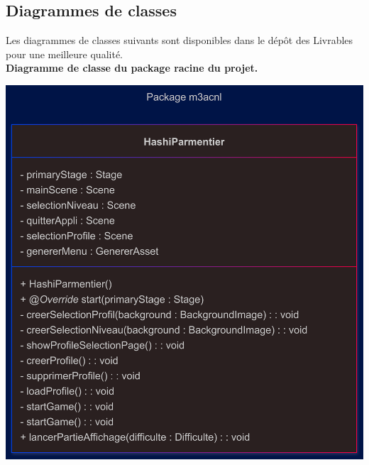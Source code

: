 \subsection{Diagrammes de classes}
Les diagrammes de classes suivants sont disponibles dans le dépôt des Livrables pour une meilleure qualité.\\


\textbf{Diagramme de classe du package racine du projet.}\\
\begin{center}
\includegraphics[width=\textwidth,height=\dimexpr\textheight-220pt\relax,keepaspectratio]{../Annexe/classes/HashiParmentier.png}
\end{center}

\pagebreak

